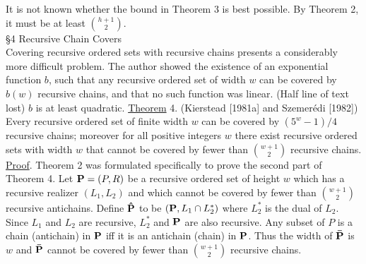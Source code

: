 \documentclass[twoside]{article}
\begin{document}
It is not known whether the bound in Theorem 3 is best possible. By Theorem 2, it must be at least $\binom{h+1}{2}$.\\


\noindent\S 4 Recursive Chain Covers\\


Covering recursive ordered sets with recursive chains presents a considerably more difficult problem.   The author showed the existence of an exponential function   $b$, such that any recursive ordered set of width   $w$ can be covered by   $b(w)$   recursive chains, and that no such function was linear.
(Half line of text lost) $b$	is at least quadratic.
\newpage
%
%
\noindent\underline{Theorem} 4.    (Kierstead [1981a] and Szemer\'{e}di [1982]) Every recursive ordered set of finite width   $w$   can be covered by $(5^w   - 1)/4$   recursive chains; moreover for all positive integers    $w$    there exist recursive ordered sets with width   $w$     that cannot be covered by fewer than  $\binom{w+1}{2}$ recursive chains.\\
\newline
\underline{Proof}.     Theorem 2 was formulated specifically to prove the second part of 
Theorem 4.    Let    $\mathbf{P} = (P,R)$ be a recursive ordered set of height $w$ which has a
recursive realizer   $(L_1,L_2)$ and which cannot be covered by fewer than $\binom{w+1}{2}$
recursive antichains.    Define   $\mathbf{\hat{P}}$   to be $(\mathbf{P},L_1\cap L_2^*)$ where	$L_2^*$ is the dual of
$L_2$.    Since   $L_1$   and   $L_2$   are recursive,  $L_2^*$     and $\mathbf{P}$   are also recursive. Any subset of   $P$   is a chain (antichain) in   $\mathbf{P}$   iff it is an antichain (chain) in $\mathbf{P}$.    
Thus the width of   $\mathbf{\bar{P}}$   is   $w$   and   $\mathbf{\bar{P}}$   cannot be covered by fewer than $\binom{w+1}{2}$ recursive chains.\\
\end{document}
